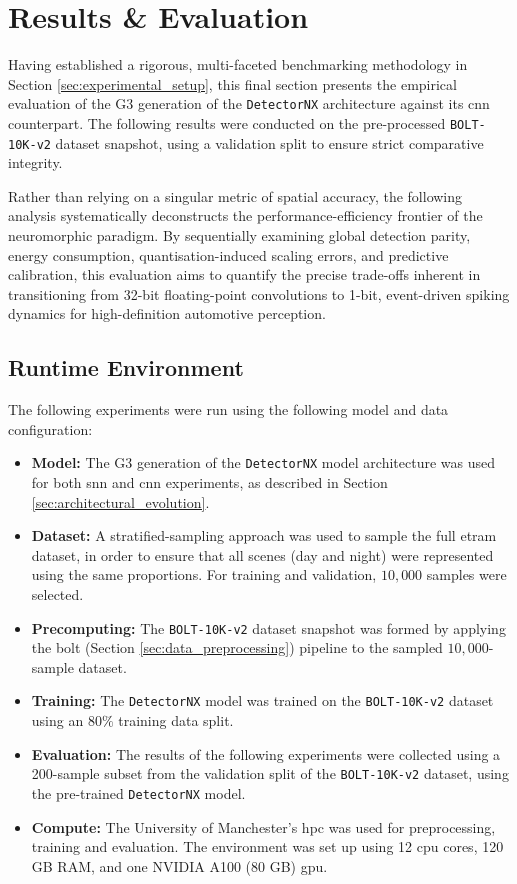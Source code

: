 \section{Results \& Evaluation}
\label{sec:results_evaluation}

Having established a rigorous, multi-faceted benchmarking methodology in Section \ref{sec:experimental_setup},
this final section presents the empirical evaluation of the G3 generation of the \texttt{DetectorNX} architecture against its \gls{cnn} counterpart.
The following results were conducted on the pre-processed \texttt{BOLT-10K-v2} dataset snapshot, using a validation split to ensure strict comparative integrity.

Rather than relying on a singular metric of spatial accuracy, the following analysis systematically deconstructs the performance-efficiency frontier of the neuromorphic paradigm.
By sequentially examining global detection parity, energy consumption, quantisation-induced scaling errors, and predictive calibration, 
this evaluation aims to quantify the precise trade-offs inherent in transitioning from 32-bit floating-point convolutions to 1-bit, 
event-driven spiking dynamics for high-definition automotive perception.

\subsection*{Runtime Environment}
\label{subsec:runtime_environment}
The following experiments were run using the following model and data configuration:

\begin{itemize}
    \item \textbf{Model:} The G3 generation of the \texttt{DetectorNX} model architecture was used for both \gls{snn} and \gls{cnn} experiments, as described in Section \ref{sec:architectural_evolution}.
    \item \textbf{Dataset:} A stratified-sampling approach was used to sample the full \gls{etram} dataset, in order to ensure that all scenes (day and night) were represented using the same proportions. For training and validation, $10,000$ samples were selected.
    \item \textbf{Precomputing:} The \texttt{BOLT-10K-v2} dataset snapshot was formed by applying the \gls{bolt} (Section \ref{sec:data_preprocessing}) pipeline to the sampled $10,000$-sample dataset.
    \item \textbf{Training:} The \texttt{DetectorNX} model was trained on the \texttt{BOLT-10K-v2} dataset using an $80\%$ training data split.
    \item \textbf{Evaluation:} The results of the following experiments were collected using a 200-sample subset from the validation split of the \texttt{BOLT-10K-v2} dataset, using the pre-trained \texttt{DetectorNX} model.
    \item \textbf{Compute:} The University of Manchester's \gls{hpc} was used for preprocessing, training and evaluation. The environment was set up using 12 \gls{cpu} cores, 120 GB RAM, and one NVIDIA A100 (80 GB) \gls{gpu}.
\end{itemize}

